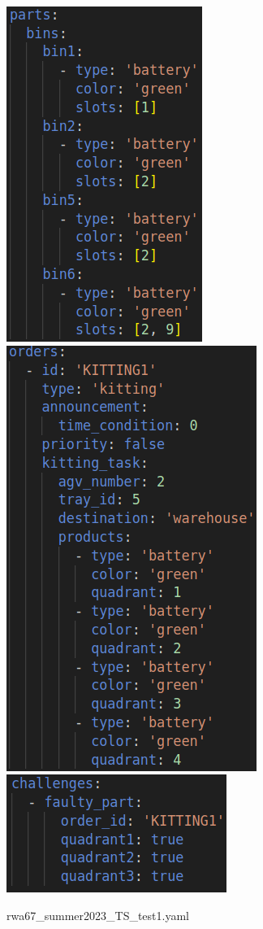 \documentclass{uva-inf-article}
\begin{document}
\begin{figure}[h]
\centering
\includegraphics[scale=0.555]{images/rwa67_trial_6.png}
\includegraphics[scale=0.44]{images/rwa67_trial_7.png}
\includegraphics[scale=0.50]{images/rwa67_trial_8.png}
\caption{rwa67\_summer2023\_TS\_test1.yaml}
\label{fig:TStest1}
\end{figure}
\end{document}
